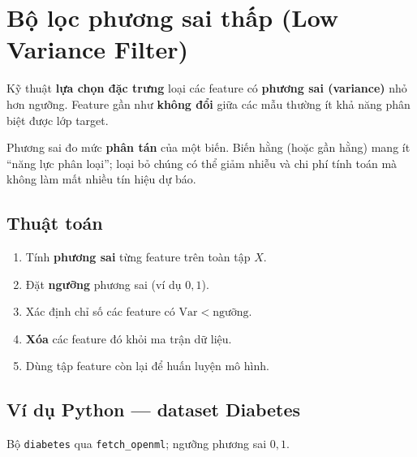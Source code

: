 \section{Bộ lọc phương sai thấp (Low Variance Filter)}
\label{sec:low-variance-filter}

\begin{dinhnghia}[title={Bộ lọc phương sai thấp}]
Kỹ thuật \textbf{lựa chọn đặc trưng} loại các feature có \textbf{phương sai (variance)} nhỏ hơn ngưỡng. Feature gần như \textbf{không đổi} giữa các mẫu thường ít khả năng phân biệt được lớp target.
\end{dinhnghia}

\begin{ynghia}[title={Ý nghĩa}]
Phương sai đo mức \textbf{phân tán} của một biến. Biến hằng (hoặc gần hằng) mang ít ``năng lực phân loại''; loại bỏ chúng có thể giảm nhiễu và chi phí tính toán mà không làm mất nhiều tín hiệu dự báo.
\end{ynghia}

\subsection{Thuật toán}

\begin{phuongphap}[title={Các bước triển khai}]
\begin{enumerate}
  \item Tính \textbf{phương sai} từng feature trên toàn tập $X$.
  \item Đặt \textbf{ngưỡng} phương sai (ví dụ $0{,}1$).
  \item Xác định chỉ số các feature có $\mathrm{Var} < \text{ngưỡng}$.
  \item \textbf{Xóa} các feature đó khỏi ma trận dữ liệu.
  \item Dùng tập feature còn lại để huấn luyện mô hình.
\end{enumerate}
\end{phuongphap}

\subsection{Ví dụ Python --- dataset Diabetes}

\begin{dongco}[title={Dữ liệu và ngưỡng}]
Bộ \texttt{diabetes} qua \texttt{fetch\_openml}; ngưỡng phương sai $0{,}1$.
\end{dongco}

